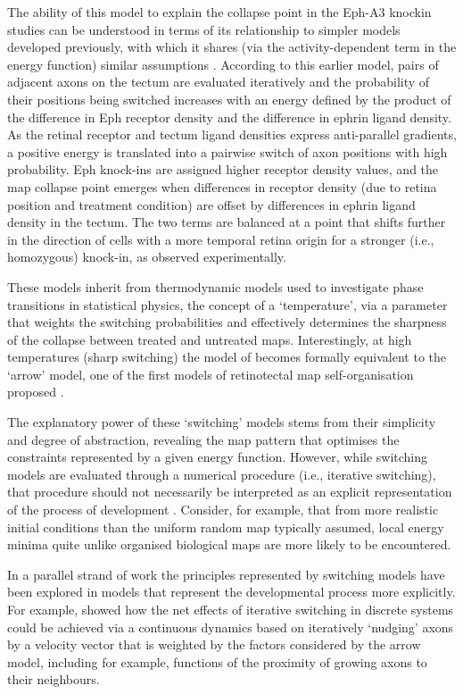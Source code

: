 \documentclass[9pt]{elife} %
\begin{document}
The ability of this model to explain the collapse point in the Eph-A3 knockin studies can be understood in terms of its relationship to simpler models developed previously, with which it shares (via the activity-dependent term in the energy function) similar assumptions \citep{Koulakov2004}. According to this earlier model, pairs of adjacent axons on the tectum are evaluated iteratively and the probability of their positions being switched increases with an energy defined by the product of the difference in Eph receptor density and the difference in ephrin ligand density. As the retinal receptor and tectum ligand densities express anti-parallel gradients, a positive energy is translated into a pairwise switch of axon positions with high probability. Eph knock-ins are assigned higher receptor density values, and the map collapse point emerges when differences in receptor density (due to retina position and treatment condition) are offset by differences in ephrin ligand density in the tectum. The two terms are balanced at a point that shifts further in the direction of cells with a more temporal retina origin for a stronger (i.e., homozygous) knock-in, as observed experimentally.

These models inherit from thermodynamic models used to investigate phase transitions in statistical physics, the concept of a `temperature', via a parameter that weights the switching probabilities and effectively determines the sharpness of the collapse between treated and untreated maps. Interestingly, at high temperatures (sharp switching) the model of \cite{Koulakov2004} becomes formally equivalent to the `arrow’ model, one of the first models of retinotectal map self-organisation proposed  \citep{Hope1976}.

The explanatory power of these `switching' models stems from their simplicity and degree of abstraction, revealing the map pattern that optimises the constraints represented by a given energy function. However, while switching models are evaluated through a numerical procedure (i.e., iterative switching), that procedure should not necessarily be interpreted as an explicit representation of the process of development \citep{Wilson2015}. Consider, for example, that from more realistic initial conditions than the uniform random map typically assumed, local energy minima quite unlike organised biological maps are more likely to be encountered.

In a parallel strand of work the principles represented by switching models have been explored in models that represent the developmental process more explicitly. For example, \cite{Overton1982} showed how the net effects of iterative switching in discrete systems could be achieved via a continuous dynamics based on iteratively ‘nudging’ axons by a velocity vector that is weighted by the factors considered by the arrow model, including for example, functions of the proximity of growing axons to their neighbours.
\end{document}
